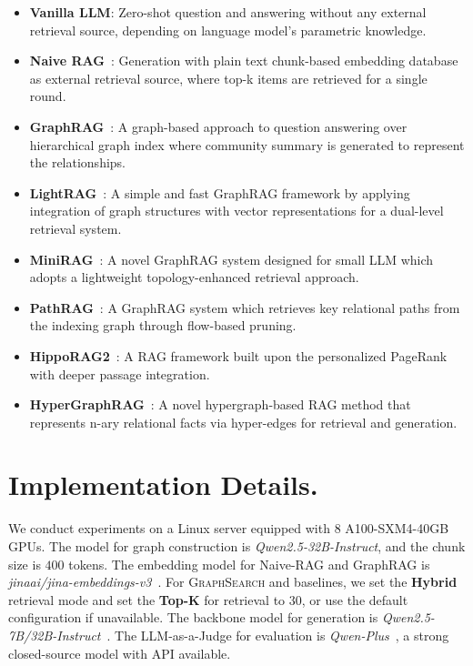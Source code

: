 \begin{itemize}[leftmargin=*]
\item \textbf{Vanilla LLM}: Zero-shot question and answering without any external retrieval source, depending on language model's parametric knowledge. 
\item \textbf{Naive RAG}~\citep{rag}: Generation with plain text chunk-based embedding database as external retrieval source, where top-k items are retrieved for a single round.
\item \textbf{GraphRAG}~\citep{graphrag}: A graph-based approach to question answering over hierarchical graph index where community summary is generated to represent the relationships.
\item \textbf{LightRAG}~\citep{lightrag}: A simple and fast GraphRAG framework by applying integration of graph structures with vector representations for a dual-level retrieval system.
\item \textbf{MiniRAG}~\citep{minirag}: A novel GraphRAG system designed for small LLM which adopts a lightweight topology-enhanced retrieval approach.
\item \textbf{PathRAG}~\citep{pathrag}: A GraphRAG system which retrieves key relational paths from the indexing graph through flow-based pruning.
\item \textbf{HippoRAG2}~\citep{hipporag2}: A RAG framework built upon the personalized PageRank with deeper passage integration.
\item \textbf{HyperGraphRAG}~\citep{hypergraphrag}: A novel hypergraph-based RAG method that represents n-ary relational facts via hyper-edges for retrieval and generation.
\end{itemize}

\section{Implementation Details.}
\label{app:implementation}
We conduct experiments on a Linux server equipped with 8 A100-SXM4-40GB GPUs. The model for graph construction is \textit{Qwen2.5-32B-Instruct}, and the chunk size is $400$ tokens. The embedding model for Naive-RAG and GraphRAG is \textit{jinaai/jina-embeddings-v3}~\citep{jina}. For \textsc{GraphSearch} and baselines, we set the \textbf{Hybrid} retrieval mode and set the \textbf{Top-K} for retrieval to $30$, or use the default configuration if unavailable. The backbone model for generation is \textit{Qwen2.5-7B/32B-Instruct}~\citep{qwen}. The LLM-as-a-Judge for evaluation is \textit{Qwen-Plus}~\citep{qwen}, a strong closed-source model with API available.

